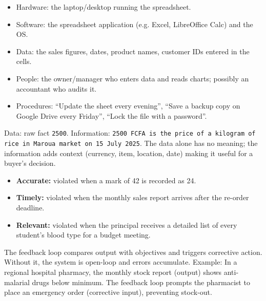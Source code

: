 \documentclass[11pt]{article}
\begin{document}
\begin{corrige}[Exercise 2]
\begin{itemize}
    \item Hardware: the laptop/desktop running the spreadsheet.
    \item Software: the spreadsheet application (e.g. Excel, LibreOffice Calc) and the OS.
    \item Data: the sales figures, dates, product names, customer IDs entered in the cells.
    \item People: the owner/manager who enters data and reads charts; possibly an accountant who audits it.
    \item Procedures: ``Update the sheet every evening'', ``Save a backup copy on Google Drive every Friday'', ``Lock the file with a password''.
\end{itemize}
\end{corrige}

\begin{corrige}[Exercise 3]
Data: raw fact \texttt{2500}. Information: \texttt{2500 FCFA is the price of a kilogram of rice in Maroua market on 15 July 2025}. The data alone has no meaning; the information adds context (currency, item, location, date) making it useful for a buyer's decision.
\end{corrige}

\begin{corrige}[Exercise 4]
\begin{itemize}
    \item \textbf{Accurate:} violated when a mark of 42 is recorded as 24.
    \item \textbf{Timely:} violated when the monthly sales report arrives after the re-order deadline.
    \item \textbf{Relevant:} violated when the principal receives a detailed list of every student's blood type for a budget meeting.
\end{itemize}
\end{corrige}

\begin{corrige}[Exercise 5]
The feedback loop compares output with objectives and triggers corrective action. Without it, the system is open-loop and errors accumulate. Example: In a regional hospital pharmacy, the monthly stock report (output) shows anti-malarial drugs below minimum. The feedback loop prompts the pharmacist to place an emergency order (corrective input), preventing stock-out.
\end{corrige}
\end{document}
